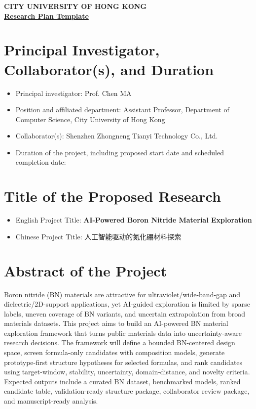 \documentclass[10pt,a4paper]{article}
\newcommand{\blank}[1][7em]{\colorbox{yellow!35}{\rule{0pt}{1.05em}\hspace{#1}}}
\begin{document}
\vspace*{-34pt}
\begin{center}
    \textbf{CITY UNIVERSITY OF HONG KONG}\\
    \vspace{6pt}
    \underline{\textbf{Research Plan Template}}
\end{center}

\section{Principal Investigator, Collaborator(s), and Duration}
\begin{itemize}[leftmargin=15pt]
    \item Principal investigator: Prof. Chen MA
    \item Position and affiliated department: Assistant Professor, Department of Computer Science, City University of Hong Kong
    \item Collaborator(s): Shenzhen Zhongneng Tianyi Technology Co., Ltd.
    \item Duration of the project, including proposed start date and scheduled completion date:\\[-1pt]\blank[18em]
\end{itemize}

\section{Title of the Proposed Research}
\begin{itemize}[leftmargin=15pt]
    \item English Project Title: \textbf{AI-Powered Boron Nitride Material Exploration}
    \item Chinese Project Title: 人工智能驱动的氮化硼材料探索
\end{itemize}

\section{Abstract of the Project}
Boron nitride (BN) materials are attractive for ultraviolet/wide-band-gap and dielectric/2D-support applications, yet AI-guided exploration is limited by sparse labels, uneven coverage of BN variants, and uncertain extrapolation from broad materials datasets. This project aims to build an AI-powered BN material exploration framework that turns public materials data into uncertainty-aware research decisions. The framework will define a bounded BN-centered design space, screen formula-only candidates with composition models, generate prototype-first structure hypotheses for selected formulas, and rank candidates using target-window, stability, uncertainty, domain-distance, and novelty criteria. Expected outputs include a curated BN dataset, benchmarked models, ranked candidate table, validation-ready structure package, collaborator review package, and manuscript-ready analysis.
\end{document}
